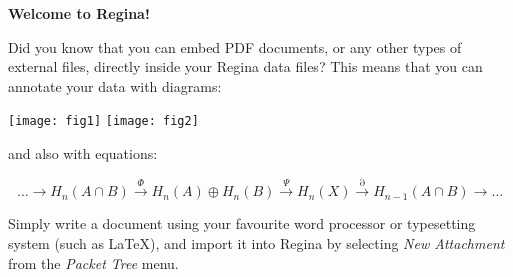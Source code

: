 \documentclass[a4paper,10pt]{article}
\begin{document}
\thispagestyle{empty}
\centerline{\large \bf{Welcome to Regina!}}

\bigskip

Did you know that you can embed PDF documents, or any other types of
external files, directly inside your Regina data files?
This means that you can annotate your data with diagrams:

\bigskip

\centerline{
    \texttt{[image: fig1]}\qquad\qquad
    \texttt{[image: fig2]}}

\medskip

\noindent
and also with equations:

\[ \ldots
    \longrightarrow H_n(A \cap B)
    \stackrel{\Phi}{\longrightarrow} H_n(A) \oplus H_n(B)
    \stackrel{\Psi}{\longrightarrow} H_n(X)
    \stackrel{\partial}{\longrightarrow} H_{n-1}(A \cap B)
    \longrightarrow \ldots
\]

Simply write a document using your favourite word processor or
typesetting system (such as \LaTeX), and import it into Regina by selecting
\emph{New Attachment} from the \emph{Packet Tree} menu.
\end{document}
